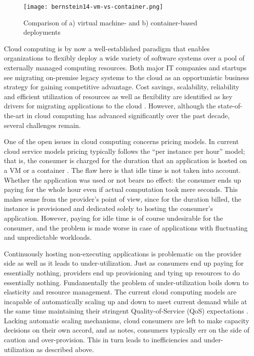 \begin{figure}[h]
  \centering
  \texttt{[image: bernstein14-vm-vs-container.png]}
  \caption{Comparison of a) virtual machine- and b) container-based deployments \parencite{bernstein14containers}}
  \label{fig:vmVsContainer}
\end{figure}

Cloud computing is by now a well-established paradigm that enables organizations to flexibly deploy a wide variety of software systems over a pool of externally managed computing resources. Both major IT companies and startups see migrating on-premise legacy systems to the cloud as an opportunistic business strategy for gaining competitive advantage. Cost savings, scalability, reliability and efficient utilization of resources as well as flexibility are identified as key drivers for migrating applications to the cloud \parencite{jamshidi13cloudmigrationreview}. However, although the state-of-the-art in cloud computing has advanced significantly over the past decade, several challenges remain.

One of the open issues in cloud computing concerns pricing models. In current cloud service models pricing typically follows the ``per instance per hour'' model; that is, the consumer is charged for the duration that an application is hosted on a VM or a container \parencite{varghese18next}. The flaw here is that idle time is not taken into account. Whether the application was used or not bears no effect: the consumer ends up paying for the whole hour even if actual computation took mere seconds. This makes sense from the provider's point of view, since for the duration billed, the instance is provisioned and dedicated solely to hosting the consumer's application. However, paying for idle time is of course undesirable for the consumer, and the problem is made worse in case of applications with fluctuating and unpredictable workloads.

Continuously hosting non-executing applications is problematic on the provider side as well as it leads to under-utilization. Just as consumers end up paying for essentially nothing, providers end up provisioning and tying up resources to do essentially nothing. Fundamentally the problem of under-utilization boils down to elasticity and resource management. The current cloud computing models are incapable of automatically scaling up and down to meet current demand while at the same time maintaining their stringent Quality-of-Service (QoS) expectations \parencite{buyya2017manifesto}. Lacking automatic scaling mechanisms, cloud consumers are left to make capacity decisions on their own accord, and as \textcite{robert2016serverlessarchitectures} notes, consumers typically err on the side of caution and over-provision. This in turn leads to inefficiencies and under-utilization as described above.

